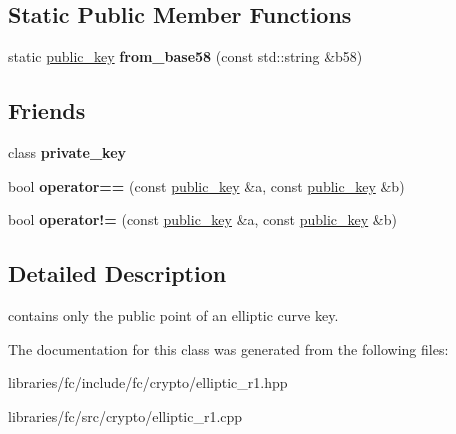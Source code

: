 \subsection*{Static Public Member Functions}
\begin{DoxyCompactItemize}
\item 
\mbox{\label{classfc_1_1crypto_1_1r1_1_1public__key_a1167b667bd6a9a67c65d09174d583427}} 
static \mbox{\hyperlink{classfc_1_1crypto_1_1r1_1_1public__key}{public\+\_\+key}} {\bfseries from\+\_\+base58} (const std\+::string \&b58)
\end{DoxyCompactItemize}
\subsection*{Friends}
\begin{DoxyCompactItemize}
\item 
\mbox{\label{classfc_1_1crypto_1_1r1_1_1public__key_ae1389c6c19ec8630ce31970de2294915}} 
class {\bfseries private\+\_\+key}
\item 
\mbox{\label{classfc_1_1crypto_1_1r1_1_1public__key_a4f2610bdec460bf2b0203684a9599da5}} 
bool {\bfseries operator==} (const \mbox{\hyperlink{classfc_1_1crypto_1_1r1_1_1public__key}{public\+\_\+key}} \&a, const \mbox{\hyperlink{classfc_1_1crypto_1_1r1_1_1public__key}{public\+\_\+key}} \&b)
\item 
\mbox{\label{classfc_1_1crypto_1_1r1_1_1public__key_a5faa639eb95ed12c1be5d8ae65c7cb54}} 
bool {\bfseries operator!=} (const \mbox{\hyperlink{classfc_1_1crypto_1_1r1_1_1public__key}{public\+\_\+key}} \&a, const \mbox{\hyperlink{classfc_1_1crypto_1_1r1_1_1public__key}{public\+\_\+key}} \&b)
\end{DoxyCompactItemize}


\subsection{Detailed Description}
contains only the public point of an elliptic curve key. 

The documentation for this class was generated from the following files\+:\begin{DoxyCompactItemize}
\item 
libraries/fc/include/fc/crypto/elliptic\+\_\+r1.\+hpp\item 
libraries/fc/src/crypto/elliptic\+\_\+r1.\+cpp\end{DoxyCompactItemize}
